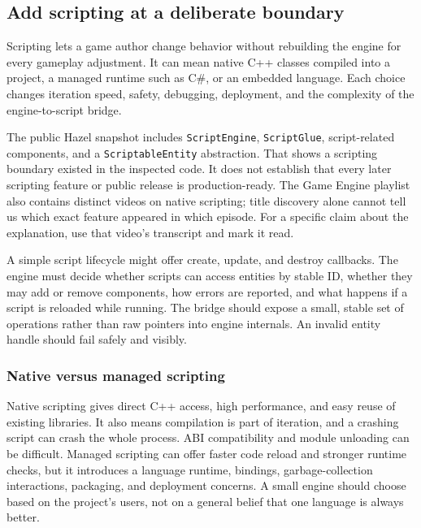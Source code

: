 \subsection{Add scripting at a deliberate boundary}\label{06-engine-ii-ch040-add-scripting-at-a-deliberate-boundary}

Scripting lets a game author change behavior without rebuilding the engine for every gameplay adjustment. It can mean native C++ classes compiled into a project, a managed runtime such as C\#, or an embedded language. Each choice changes iteration speed, safety, debugging, deployment, and the complexity of the engine-to-script bridge.

The public Hazel snapshot includes \texttt{ScriptEngine}, \texttt{ScriptGlue}, script-related components, and a \texttt{ScriptableEntity} abstraction. That shows a scripting boundary existed in the inspected code. It does not establish that every later scripting feature or public release is production-ready. The Game Engine playlist also contains distinct videos on native scripting; title discovery alone cannot tell us which exact feature appeared in which episode. For a specific claim about the explanation, use that video's transcript and mark it read.

A simple script lifecycle might offer create, update, and destroy callbacks. The engine must decide whether scripts can access entities by stable ID, whether they may add or remove components, how errors are reported, and what happens if a script is reloaded while running. The bridge should expose a small, stable set of operations rather than raw pointers into engine internals. An invalid entity handle should fail safely and visibly.

\subsubsection{Native versus managed scripting}\label{06-engine-ii-ch040-native-versus-managed-scripting}

Native scripting gives direct C++ access, high performance, and easy reuse of existing libraries. It also means compilation is part of iteration, and a crashing script can crash the whole process. ABI compatibility and module unloading can be difficult. Managed scripting can offer faster code reload and stronger runtime checks, but it introduces a language runtime, bindings, garbage-collection interactions, packaging, and deployment concerns. A small engine should choose based on the project's users, not on a general belief that one language is always better.

